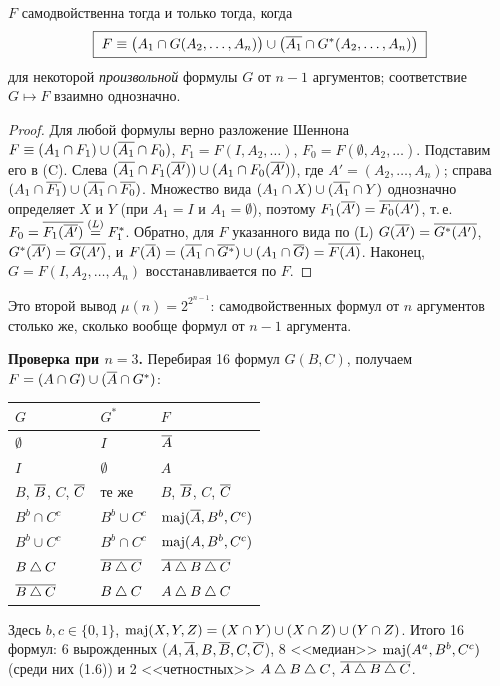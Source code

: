 \begin{solution}[2 (\S\,3)]
\begin{theorem*}[порождение]
$F$ самодвойственна тогда и только тогда, когда
\[
\boxed{\;F\equiv\bigl(A_1\cap G(A_2,\dots,A_n)\bigr)\cup\bigl(\overline{A_1}\cap G^*(A_2,\dots,A_n)\bigr)\;}
\]
для некоторой \emph{произвольной} формулы $G$ от $n-1$ аргументов;
соответствие $G\mapsto F$ взаимно однозначно.
\end{theorem*}
\begin{proof}
Для любой формулы верно разложение Шеннона
$F\equiv(A_1\cap F_1)\cup(\overline{A_1}\cap F_0)$, $F_1=F(I,A_2,\dots)$,
$F_0=F(\emptyset,A_2,\dots)$. Подставим его в (C). Слева
$(\overline{A_1}\cap F_1(\overline{A'}))\cup(A_1\cap F_0(\overline{A'}))$, где
$A'=(A_2,\dots,A_n)$; справа
$(A_1\cap\overline{F_1})\cup(\overline{A_1}\cap\overline{F_0})$. Множество вида
$(A_1\cap X)\cup(\overline{A_1}\cap Y)$ однозначно определяет $X$ и $Y$ (при
$A_1=I$ и $A_1=\emptyset$), поэтому
$F_1(\overline{A'})=\overline{F_0(A')}$, т.\,е. $F_0=\overline{F_1(\overline{A'})}\overset{(L)}{=}F_1^*$.
Обратно, для $F$ указанного вида по (L) $G(\overline{A'})=\overline{G^*(A')}$,
$G^*(\overline{A'})=\overline{G(A')}$, и
$F(\overline{A})=(\overline{A_1}\cap\overline{G^*})\cup(A_1\cap\overline{G})=\overline{F(A)}$.
Наконец, $G=F(I,A_2,\dots,A_n)$ восстанавливается по $F$.
\end{proof}
Это второй вывод $\mu(n)=2^{2^{n-1}}$: самодвойственных формул от $n$
аргументов столько же, сколько вообще формул от $n-1$ аргумента.

\textbf{Проверка при $n=3$.} Перебирая 16 формул $G(B,C)$, получаем
$F=(A\cap G)\cup(\overline{A}\cap G^*)$:
\begin{center}\small
\begin{tabular}{lll}
\toprule
$G$ & $G^*$ & $F$\\ \midrule
$\emptyset$ & $I$ & $\overline{A}$\\
$I$ & $\emptyset$ & $A$\\
$B$, $\overline{B}$, $C$, $\overline{C}$ & те же & $B$, $\overline{B}$, $C$, $\overline{C}$\\
$B^b\cap C^c$ & $B^b\cup C^c$ & $\operatorname{maj}(\overline{A},B^b,C^c)$\\
$B^b\cup C^c$ & $B^b\cap C^c$ & $\operatorname{maj}(A,B^b,C^c)$\\
$B\mathbin{\triangle} C$ & $\overline{B\mathbin{\triangle} C}$ & $\overline{A\mathbin{\triangle} B\mathbin{\triangle} C}$\\
$\overline{B\mathbin{\triangle} C}$ & $B\mathbin{\triangle} C$ & $A\mathbin{\triangle} B\mathbin{\triangle} C$\\ \bottomrule
\end{tabular}
\end{center}
Здесь $b,c\in\{0,1\}$, $\operatorname{maj}(X,Y,Z)=(X\cap Y)\cup(X\cap Z)\cup(Y\cap Z)$.
Итого 16 формул: 6 вырожденных ($A,\overline{A},B,\overline{B},C,\overline{C}$), 8
<<медиан>> $\operatorname{maj}(A^a,B^b,C^c)$ (среди них (1.6)) и 2 <<четностных>>
$A\mathbin{\triangle} B\mathbin{\triangle} C$, $\overline{A\mathbin{\triangle} B\mathbin{\triangle} C}$.


\end{solution}
